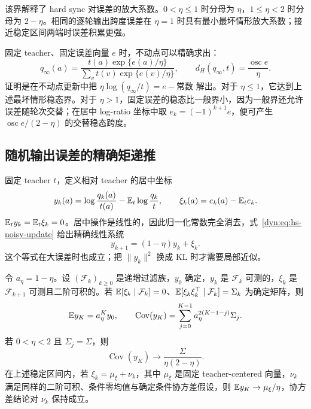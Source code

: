 该界解释了 hard sync 对误差的放大系数。$0<\eta\leq1$ 时分母为 $\eta$，$1\leq\eta<2$ 时分母为 $2-\eta$。相同的逐轮输出跨度误差在 $\eta=1$ 时具有最小最坏情形放大系数；接近稳定区间两端时误差积累更强。

固定 teacher、固定误差向量 $e$ 时，不动点可以精确求出：
\begin{equation*}
 q_\infty(a)=\frac{t(a)\exp\{e(a)/\eta\}}
 {\sum_v t(v)\exp\{e(v)/\eta\}},\qquad
 d_H(q_\infty,t)=\frac{\operatorname{osc}e}{\eta}.
\end{equation*}
证明是在不动点更新中把 $\eta\log(q_\infty/t)=e-\text{常数}$ 解出。对于 $\eta\leq1$，它达到上述最坏情形稳态界。对于 $\eta>1$，固定误差的稳态比一般界小，因为一般界还允许误差随轮次交替；在居中 log-ratio 坐标中取 $e_k=(-1)^{k+1}e$，便可产生 $\operatorname{osc}e/(2-\eta)$ 的交替稳态跨度。

\subsection{随机输出误差的精确矩递推}

固定 teacher $t$，定义相对 teacher 的居中坐标
\begin{equation*}
 y_k(a)=\log\frac{q_k(a)}{t(a)}
       -\mathbb E_t\log\frac{q_k}{t},\qquad
 \xi_k(a)=e_k(a)-\mathbb E_te_k.
\end{equation*}
$\mathbb E_ty_k=\mathbb E_t\xi_k=0$。居中操作是线性的，因此归一化常数完全消去，式~\eqref{dyn:eq:hs-noisy-update} 给出精确线性系统
\begin{equation}\label{dyn:eq:hs-centered-linear}
 y_{k+1}=(1-\eta)y_k+\xi_k.
\end{equation}
这个等式在大误差时也成立；把 $\|y_k\|^2$ 换成 KL 时才需要局部近似。

\begin{theorem}\label{dyn:thm:hs-covariance}
令 $a_\eta=1-\eta$。设 $(\mathcal F_k)_{k\ge0}$ 是递增过滤族，$y_0$ 确定，$y_k$ 是 $\mathcal F_k$ 可测的，$\xi_k$ 是 $\mathcal F_{k+1}$ 可测且二阶可积的。若 $\mathbb E[\xi_k\mid\mathcal F_k]=0$、$\mathbb E[\xi_k\xi_k^\top\mid\mathcal F_k]=\Sigma_k$ 为确定矩阵，则
\begin{equation*}
 \mathbb E y_K=a_\eta^K y_0,\qquad
 \operatorname{Cov}(y_K)=\sum_{j=0}^{K-1}a_\eta^{2(K-1-j)}\Sigma_j.
\end{equation*}
若 $0<\eta<2$ 且 $\Sigma_j=\Sigma$，则
\begin{equation}\label{dyn:eq:hs-stationary-cov}
 \operatorname{Cov}(y_K)\longrightarrow
       \frac{\Sigma}{\eta(2-\eta)}.
\end{equation}
在上述稳定区间内，若 $\xi_k=\mu_\xi+\nu_k$，其中 $\mu_\xi$ 是固定 teacher-centered 向量，$\nu_k$ 满足同样的二阶可积、条件零均值与确定条件协方差假设，则 $\mathbb E y_K\to\mu_\xi/\eta$，协方差结论对 $\nu_k$ 保持成立。
\end{theorem}

